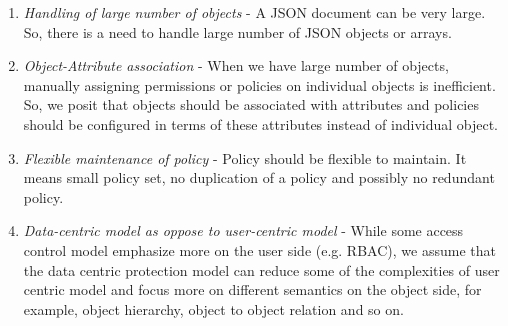 \begin{enumerate}
	\item \emph{Handling of large number of objects} -  A JSON document can be very large. So, there is a need to handle large number of JSON objects or arrays.
	
	\item \emph{Object-Attribute association} - When we  have large number of objects, manually assigning permissions or policies on individual objects is inefficient. So, we posit that objects should be associated with attributes and policies should be configured in terms of these attributes instead of individual object.
	
	 \item \emph{Flexible maintenance of policy} -  Policy should be flexible to maintain. It means small policy set, no duplication of a policy and  possibly no redundant policy.
	
	 \item \emph{Data-centric model as oppose to user-centric model} - While some access control model emphasize more  on the user side (e.g. RBAC), we assume that the data centric protection model can reduce some of the complexities of user centric model and focus more on different semantics on the object side, for example, object hierarchy, object to object relation and so on.

\end{enumerate}

\fi




























